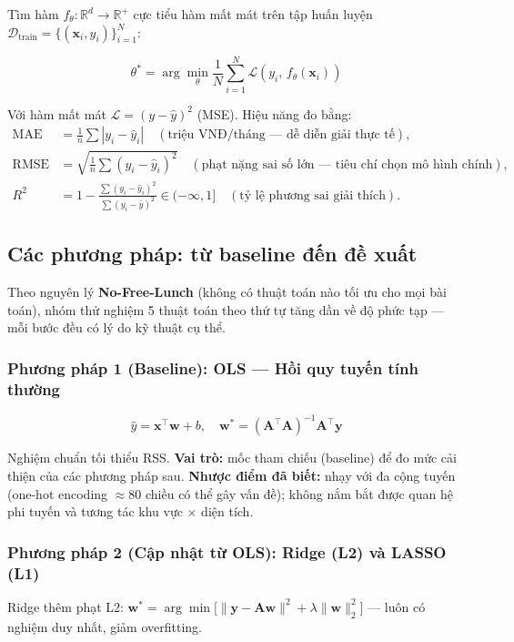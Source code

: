 Tìm hàm $f_\theta: \mathbb{R}^d \to \mathbb{R}^+$ cực tiểu hàm mất mát trên tập huấn luyện
$\mathcal{D}_\text{train} = \{(\mathbf{x}_i, y_i)\}_{i=1}^{N}$:

\[
  \theta^* = \arg\min_\theta \frac{1}{N}\sum_{i=1}^{N} \mathcal{L}(y_i,\, f_\theta(\mathbf{x}_i))
\]

Với hàm mất mát $\mathcal{L} = (y - \hat{y})^2$ (MSE).
Hiệu năng đo bằng:
\begin{align*}
  \text{MAE} &= \frac{1}{n}\sum|y_i - \hat{y}_i|
  \quad(\text{triệu VNĐ/tháng — dễ diễn giải thực tế}), \\
  \text{RMSE} &= \sqrt{\frac{1}{n}\sum(y_i - \hat{y}_i)^2}
  \quad(\text{phạt nặng sai số lớn — tiêu chí chọn mô hình chính}), \\
  R^2 &= 1 - \frac{\sum(y_i-\hat{y}_i)^2}{\sum(y_i-\bar{y})^2}
  \in (-\infty, 1]
  \quad(\text{tỷ lệ phương sai giải thích}).
\end{align*}

\subsection{Các phương pháp: từ baseline đến đề xuất}
\label{subsec:models}

Theo nguyên lý \textbf{No-Free-Lunch} (không có thuật toán nào tối ưu
cho mọi bài toán), nhóm thử nghiệm 5 thuật toán theo thứ tự tăng dần
về độ phức tạp — mỗi bước đều có lý do kỹ thuật cụ thể.

\subsubsection*{Phương pháp 1 (Baseline): OLS — Hồi quy tuyến tính thường}

\[
  \hat{y} = \mathbf{x}^\top\mathbf{w} + b,
  \quad \mathbf{w}^* = (\mathbf{A}^\top\mathbf{A})^{-1}\mathbf{A}^\top\mathbf{y}
\]

Nghiệm chuẩn tối thiểu RSS.
\textbf{Vai trò:} mốc tham chiếu (baseline) để đo mức cải thiện của các phương pháp sau.
\textbf{Nhược điểm đã biết:} nhạy với đa cộng tuyến (one-hot encoding $\approx$80 chiều có thể gây vấn đề);
không nắm bắt được quan hệ phi tuyến và tương tác khu vực × diện tích.

\subsubsection*{Phương pháp 2 (Cập nhật từ OLS): Ridge (L2) và LASSO (L1)}

Ridge thêm phạt L2:
$\mathbf{w}^* = \arg\min\bigl[\|\mathbf{y}-\mathbf{A}\mathbf{w}\|^2 + \lambda\|\mathbf{w}\|_2^2\bigr]$
— luôn có nghiệm duy nhất, giảm overfitting.

